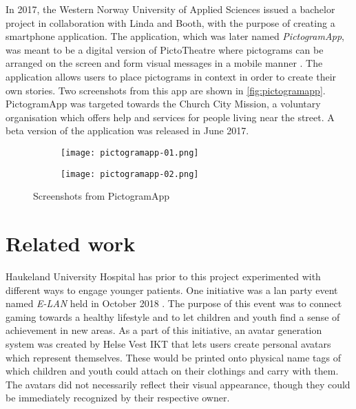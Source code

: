 In 2017, the Western Norway University of Applied Sciences issued a bachelor project in collaboration with Linda and Booth, with the purpose of creating a smartphone application. The application, which was later named \emph{PictogramApp}, was meant to be a digital version of PictoTheatre where pictograms can be arranged on the screen and form visual messages in a mobile manner \autocite{fure2017}. The application allows users to place pictograms in context in order to create their own stories. Two screenshots from this app are shown in \autoref{fig:pictogramapp}. PictogramApp was targeted towards the Church City Mission, a voluntary organisation which offers help and services for people living near the street. A beta version of the application was released in June 2017.

\begin{figure}
    \centering
    \hspace{\fill}
    \begin{subfigure}{0.31\textwidth}
        \centering
        \texttt{[image: pictogramapp-01.png]}
        \label{fig:pictogramapp-list}
    \end{subfigure}
    \hspace{\fill}
    \begin{subfigure}{0.31\textwidth}
        \centering
        \texttt{[image: pictogramapp-02.png]}
        \label{fig:pictogramapp-scene}
    \end{subfigure}
    \hspace*{\fill}
    \caption{Screenshots from PictogramApp}
    \label{fig:pictogramapp}
\end{figure}

\section{Related work}
\label{sec:relatedwork}

Haukeland University Hospital has prior to this project experimented with different ways to engage younger patients. One initiative was a lan party event named \emph{E-LAN} held in October 2018 \autocite{helsebergen2018}. The purpose of this event was to connect gaming towards a healthy lifestyle and to let children and youth find a sense of achievement in new areas. As a part of this initiative, an avatar generation system was created by Helse Vest IKT that lets users create personal avatars which represent themselves. These would be printed onto physical name tags of which children and youth could attach on their clothings and carry with them. The avatars did not necessarily reflect their visual appearance, though they could be immediately recognized by their respective owner.

